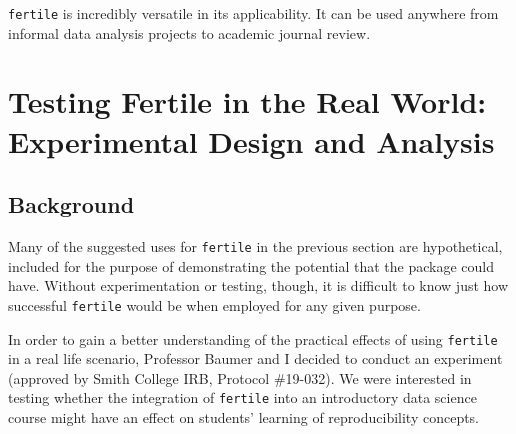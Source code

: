 \documentclass[12pt,twoside]{reedthesis}
\begin{document}
\texttt{fertile} is incredibly versatile in its applicability. It can be used anywhere from informal data analysis projects to academic journal review.

\hypertarget{testing-fertile-in-the-real-world-experimental-design-and-analysis}{%
\section{Testing Fertile in the Real World: Experimental Design and Analysis}\label{testing-fertile-in-the-real-world-experimental-design-and-analysis}}

\hypertarget{background}{%
\subsection{Background}\label{background}}

Many of the suggested uses for \texttt{fertile} in the previous section are hypothetical, included for the purpose of demonstrating the potential that the package could have. Without experimentation or testing, though, it is difficult to know just how successful \texttt{fertile} would be when employed for any given purpose.

In order to gain a better understanding of the practical effects of using \texttt{fertile} in a real life scenario, Professor Baumer and I decided to conduct an experiment (approved by Smith College IRB, Protocol \#19-032). We were interested in testing whether the integration of \texttt{fertile} into an introductory data science course might have an effect on students' learning of reproducibility concepts.
\end{document}
